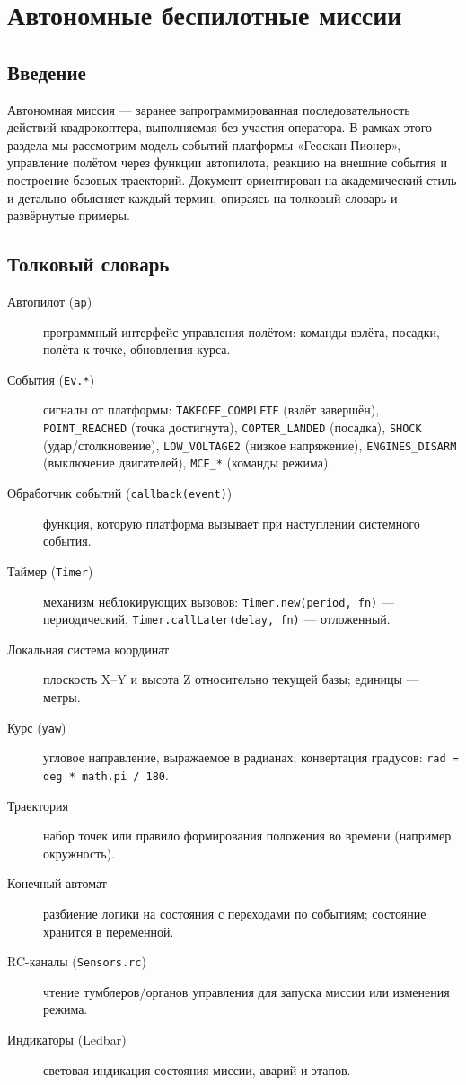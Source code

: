 \section{Автономные беспилотные миссии}
\subsection{Введение}
Автономная миссия — заранее запрограммированная последовательность действий квадрокоптера, выполняемая без участия оператора. В рамках этого раздела мы рассмотрим модель событий платформы «Геоскан Пионер», управление полётом через функции автопилота, реакцию на внешние события и построение базовых траекторий. Документ ориентирован на академический стиль и детально объясняет каждый термин, опираясь на толковый словарь и развёрнутые примеры.

\subsection{Толковый словарь}
\begin{description}
  \item[Автопилот (\texttt{ap})] программный интерфейс управления полётом: команды взлёта, посадки, полёта к точке, обновления курса.
  \item[События (\texttt{Ev.*})] сигналы от платформы: \texttt{TAKEOFF\_COMPLETE} (взлёт завершён), \texttt{POINT\_REACHED} (точка достигнута), \texttt{COPTER\_LANDED} (посадка), \texttt{SHOCK} (удар/столкновение), \texttt{LOW\_VOLTAGE2} (низкое напряжение), \texttt{ENGINES\_DISARM} (выключение двигателей), \texttt{MCE\_*} (команды режима).
  \item[Обработчик событий (\texttt{callback(event)})] функция, которую платформа вызывает при наступлении системного события.
  \item[Таймер (\texttt{Timer})] механизм неблокирующих вызовов: \texttt{Timer.new(period, fn)} — периодический, \texttt{Timer.callLater(delay, fn)} — отложенный.
  \item[Локальная система координат] плоскость X–Y и высота Z относительно текущей базы; единицы — метры.
  \item[Курс (\texttt{yaw})] угловое направление, выражаемое в радианах; конвертация градусов: \texttt{rad = deg * math.pi / 180}.
  \item[Траектория] набор точек или правило формирования положения во времени (например, окружность).
  \item[Конечный автомат] разбиение логики на состояния с переходами по событиям; состояние хранится в переменной.
  \item[RC-каналы (\texttt{Sensors.rc})] чтение тумблеров/органов управления для запуска миссии или изменения режима.
  \item[Индикаторы (Ledbar)] световая индикация состояния миссии, аварий и этапов.
\end{description}

